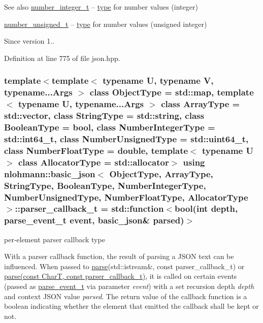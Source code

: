 \begin{DoxySeeAlso}{See also}
\hyperlink{classnlohmann_1_1basic__json_ac4b10b2364f26ce47bdb9a413ff04a59}{number\+\_\+integer\+\_\+t} -- \hyperlink{classnlohmann_1_1basic__json_a848cbae3bd3502ffbf738320bf5eb3aa}{type} for number values (integer)

\hyperlink{classnlohmann_1_1basic__json_a60a04166c122072ab11eaf9845d9cd1d}{number\+\_\+unsigned\+\_\+t} -- \hyperlink{classnlohmann_1_1basic__json_a848cbae3bd3502ffbf738320bf5eb3aa}{type} for number values (unsigned integer)
\end{DoxySeeAlso}
\begin{DoxySince}{Since}
version 1.. 
\end{DoxySince}


Definition at line 775 of file json.\+hpp.

\hypertarget{classnlohmann_1_1basic__json_a9e35475e2027520a78e09f460dbe048a}{}
\subsubsection[{parser\+\_\+callback\+\_\+t}]{\setlength{\rightskip}{0pt plus 5cm}template$<$template$<$ typename U, typename V, typename...\+Args $>$ class Object\+Type = std\+::map, template$<$ typename U, typename...\+Args $>$ class Array\+Type = std\+::vector, class String\+Type  = std\+::string, class Boolean\+Type  = bool, class Number\+Integer\+Type  = std\+::int64\+\_\+t, class Number\+Unsigned\+Type  = std\+::uint64\+\_\+t, class Number\+Float\+Type  = double, template$<$ typename U $>$ class Allocator\+Type = std\+::allocator$>$ using {\bf nlohmann\+::basic\+\_\+json}$<$ Object\+Type, Array\+Type, String\+Type, Boolean\+Type, Number\+Integer\+Type, Number\+Unsigned\+Type, Number\+Float\+Type, Allocator\+Type $>$\+::{\bf parser\+\_\+callback\+\_\+t} =  std\+::function$<$bool(int depth, {\bf parse\+\_\+event\+\_\+t} event, {\bf basic\+\_\+json}\& parsed)$>$}\label{classnlohmann_1_1basic__json_a9e35475e2027520a78e09f460dbe048a}


per-\/element parser callback type 

With a parser callback function, the result of parsing a J\+S\+O\+N text can be influenced. When passed to \hyperlink{classnlohmann_1_1basic__json_ace63ac4eb1dd7251a259d32e397461a3}{parse}(std\+::istream\&, const parser\+\_\+callback\+\_\+t) or \hyperlink{classnlohmann_1_1basic__json_a628a37ce21fc6e6e2009dca2609d62c2}{parse(const Char\+T, const parser\+\_\+callback\+\_\+t)}, it is called on certain events (passed as \hyperlink{classnlohmann_1_1basic__json_aea1c863b719b4ca5b77188c171bbfafe}{parse\+\_\+event\+\_\+t} via parameter {\itshape event}) with a set recursion depth {\itshape depth} and context J\+S\+O\+N value {\itshape parsed}. The return value of the callback function is a boolean indicating whether the element that emitted the callback shall be kept or not.

